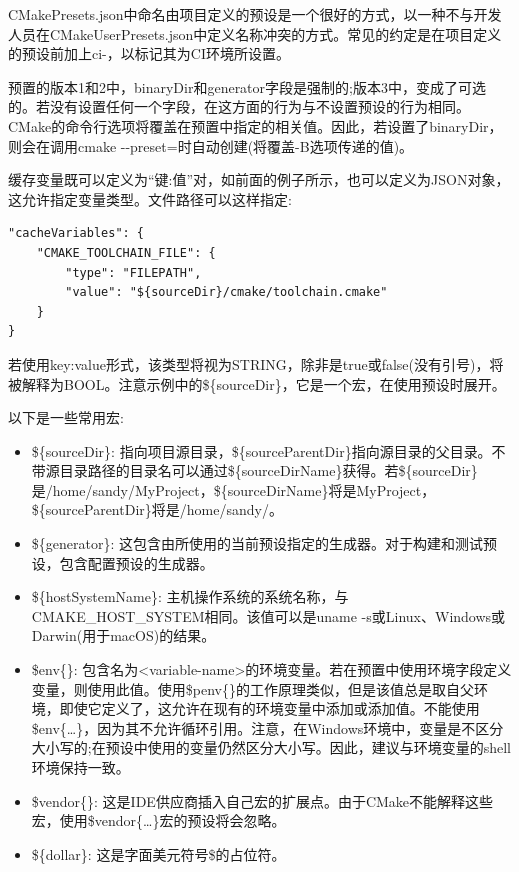 \begin{tcolorbox}[colback=blue!5!white,colframe=blue!75!black,title=预设的命名约定]
CMakePresets.json中命名由项目定义的预设是一个很好的方式，以一种不与开发人员在CMakeUserPresets.json中定义名称冲突的方式。常见的约定是在项目定义的预设前加上ci-，以标记其为CI环境所设置。
\end{tcolorbox}

预置的版本1和2中，binaryDir和generator字段是强制的;版本3中，变成了可选的。若没有设置任何一个字段，在这方面的行为与不设置预设的行为相同。CMake的命令行选项将覆盖在预置中指定的相关值。因此，若设置了binaryDir，则会在调用cmake -{}-preset=时自动创建(将覆盖-B选项传递的值)。

缓存变量既可以定义为“键:值”对，如前面的例子所示，也可以定义为JSON对象，这允许指定变量类型。文件路径可以这样指定:

\begin{lstlisting}[style=styleCMake]
"cacheVariables": {
	"CMAKE_TOOLCHAIN_FILE": {
		"type": "FILEPATH",
		"value": "${sourceDir}/cmake/toolchain.cmake"
	}
}
\end{lstlisting}

若使用key:value形式，该类型将视为STRING，除非是true或false(没有引号)，将被解释为BOOL。注意示例中的\$\{sourceDir\}，它是一个宏，在使用预设时展开。

以下是一些常用宏:

\begin{itemize}
\item 
\$\{sourceDir\}: 指向项目源目录，\$\{sourceParentDir\}指向源目录的父目录。不带源目录路径的目录名可以通过\$\{sourceDirName\}获得。若\$\{sourceDir\}是/home/sandy/MyProject，\$\{sourceDirName\}将是MyProject， \$\{sourceParentDir\}将是/home/sandy/。

\item 
\$\{generator\}: 这包含由所使用的当前预设指定的生成器。对于构建和测试预设，包含配置预设的生成器。

\item 
\$\{hostSystemName\}: 主机操作系统的系统名称，与CMAKE\_HOST\_SYSTEM相同。该值可以是uname -s或Linux、Windows或Darwin(用于macOS)的结果。

\item
\$env\{<variable-name>\}: 包含名为<variable-name>的环境变量。若在预置中使用环境字段定义变量，则使用此值。使用\$penv\{<variable-name>\}的工作原理类似，但是该值总是取自父环境，即使它定义了，这允许在现有的环境变量中添加或添加值。不能使用\$env\{…\}，因为其不允许循环引用。注意，在Windows环境中，变量是不区分大小写的;在预设中使用的变量仍然区分大小写。因此，建议与环境变量的shell环境保持一致。

\item
\$vendor\{<macro-name>\}: 这是IDE供应商插入自己宏的扩展点。由于CMake不能解释这些宏，使用\$vendor\{…\}宏的预设将会忽略。

\item
\$\{dollar\}: 这是字面美元符号\$的占位符。
\end{itemize}

